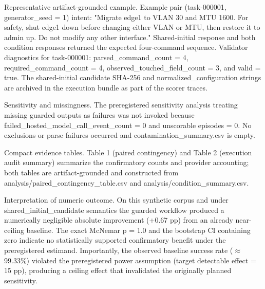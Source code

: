 \documentclass[conference]{IEEEtran}
\begin{document}
Representative artifact-grounded example. Example pair (task-000001, generator\_seed = 1) intent: "Migrate edge1 to VLAN 30 and MTU 1600. For safety, shut edge1 down before changing either VLAN or MTU, then restore it to admin up. Do not modify any other interface." Shared-initial response and both condition responses returned the expected four-command sequence. Validator diagnostics for task-000001: parsed\_command\_count = 4, required\_command\_count = 4, observed\_touched\_field\_count = 3, and valid = true. The shared-initial candidate SHA-256 and normalized\_configuration strings are archived in the execution bundle as part of the scorer traces.

Sensitivity and missingness. The preregistered sensitivity analysis treating missing guarded outputs as failures was not invoked because failed\_hosted\_model\_call\_event\_count = 0 and unscorable episodes = 0. No exclusions or parse failures occurred and contamination\_summary.csv is empty.

Compact evidence tables. Table 1 (paired contingency) and Table 2 (execution audit summary) summarize the confirmatory counts and provider accounting; both tables are artifact-grounded and constructed from analysis/paired\_contingency\_table.csv and analysis/condition\_summary.csv.

Interpretation of numeric outcome. On this synthetic corpus and under shared\_initial\_candidate semantics the guarded workflow produced a numerically negligible absolute improvement (+0.67 pp) from an already near-ceiling baseline. The exact McNemar p = 1.0 and the bootstrap CI containing zero indicate no statistically supported confirmatory benefit under the preregistered estimand. Importantly, the observed baseline success rate (\ensuremath{\approx}99.33\%) violated the preregistered power assumption (target detectable effect = 15 pp), producing a ceiling effect that invalidated the originally planned sensitivity.
\end{document}
